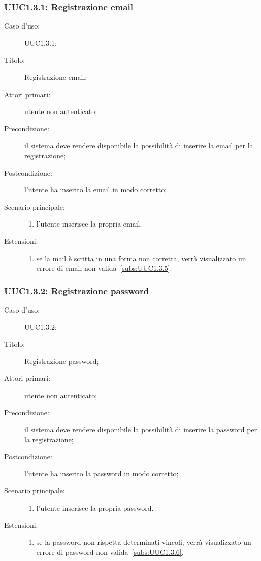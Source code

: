 \documentclass[../../../analisi-dei-requisiti.tex]{subfiles}
\begin{document}
\subsubsection{UUC1.3.1: Registrazione email}%
\label{subs:UUC1.3.1}
\begin{description}
  \item[Caso d’uso:] UUC1.3.1;
  \item[Titolo:] Registrazione email;
  \item[Attori primari:] utente non autenticato;
  \item[Precondizione:] il sistema deve rendere disponibile la possibilità di inserire la email per la registrazione;
  \item[Postcondizione:] l'utente ha inserito la email in modo corretto;
  \item[Scenario principale:]
        \begin{enumerate}
          \item l'utente inserisce la propria email.
        \end{enumerate}
  \item[Estensioni:]
        \begin{enumerate}
          \item se la mail è scritta in una forma non corretta, verrà visualizzato un errore di email non valida~\ref{subs:UUC1.3.5}.
        \end{enumerate}
\end{description}



\subsubsection{UUC1.3.2: Registrazione password}%
\label{subs:UUC1.3.2}
\begin{description}
  \item[Caso d’uso:] UUC1.3.2;
  \item[Titolo:] Registrazione password;
  \item[Attori primari:] utente non autenticato;
  \item[Precondizione:] il sistema deve rendere disponibile la possibilità di inserire la password per la registrazione;
  \item[Postcondizione:] l'utente ha inserito la password in modo corretto;
  \item[Scenario principale:]
        \begin{enumerate}
          \item l'utente inserisce la propria password.
        \end{enumerate}
  \item[Estensioni:]
        \begin{enumerate}
          \item se la password non rispetta determinati vincoli, verrà visualizzato un errore di password non valida~\ref{subs:UUC1.3.6}.
        \end{enumerate}
\end{description}
\end{document}
